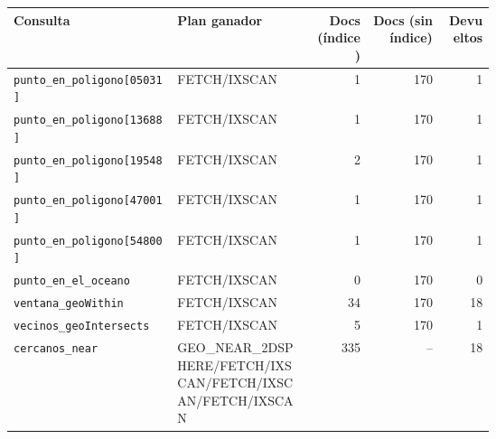 \begin{tabular}{p{0.34\linewidth}p{0.28\linewidth}rrr}
\toprule
Consulta & Plan ganador & Docs (índice) & Docs (sin índice) & Devueltos \\
\midrule
\texttt{punto\_en\_poligono[05031]} & FETCH/IXSCAN & 1 & 170 & 1 \\
\texttt{punto\_en\_poligono[13688]} & FETCH/IXSCAN & 1 & 170 & 1 \\
\texttt{punto\_en\_poligono[19548]} & FETCH/IXSCAN & 2 & 170 & 1 \\
\texttt{punto\_en\_poligono[47001]} & FETCH/IXSCAN & 1 & 170 & 1 \\
\texttt{punto\_en\_poligono[54800]} & FETCH/IXSCAN & 1 & 170 & 1 \\
\texttt{punto\_en\_el\_oceano} & FETCH/IXSCAN & 0 & 170 & 0 \\
\texttt{ventana\_geoWithin} & FETCH/IXSCAN & 34 & 170 & 18 \\
\texttt{vecinos\_geoIntersects} & FETCH/IXSCAN & 5 & 170 & 1 \\
\texttt{cercanos\_near} & GEO\_NEAR\_2DSPHERE/FETCH/IXSCAN/FETCH/IXSCAN/FETCH/IXSCAN & 335 & -- & 18 \\
\bottomrule
\end{tabular}
